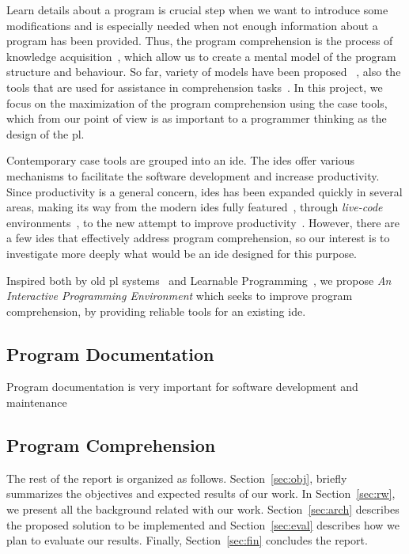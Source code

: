 Learn details about a program is crucial step when we want to introduce some modifications and is especially needed when not enough information about a program has been provided. Thus, the program comprehension is the process of knowledge acquisition~\cite{rugaber1995program}, which allow us to create a mental model of the program structure and behaviour. So far, variety of models have been proposed ~\cite{brooks1977towards,soloway1984empirical}, also the tools that are used for assistance in comprehension tasks~\cite{storey2005theories}. In this project, we focus on the maximization of the program comprehension using the \ac{case} tools, which from our point of view is as important to a programmer thinking as the design of the \ac{pl}. 

Contemporary \ac{case} tools are grouped into an \ac{ide}. The \ac{ide}s offer various mechanisms to facilitate the software development and increase productivity. Since productivity is a general concern, \ac{ide}s has been expanded quickly in several areas, making its way from the modern \ac{ide}s fully featured~\cite{carlson2005eclipse,boudreau2002netbeans}, through \textit{live-code} environments~\cite{mclean2010visualisation,sorensen2005impromptu,PER-GRA:2007,GuoSIGCSE2013}, to the new attempt to improve productivity~\cite{lighttable}. However, there are a few \ac{ide}s that effectively address program comprehension, so our interest is to investigate more deeply what would be an \ac{ide} designed for this purpose.

Inspired both by old \ac{pl} systems~\cite{papert1980mindstorms,goldberg1983smalltalk} and Learnable Programming~\cite{learnableProg,inventingPrin}, we propose \textit{An Interactive Programming Environment} which seeks to improve program comprehension, by providing reliable tools for an existing \ac{ide}. 



\subsection{Program Documentation}

Program documentation is very important for software development and maintenance

\subsection{Program Comprehension}



The rest of the report is organized as follows. Section~\ref{sec:obj}, briefly summarizes the objectives and expected results of our work. In Section~\ref{sec:rw}, we present all the background related with our work. Section~\ref{sec:arch} describes the proposed solution to be implemented and Section~\ref{sec:eval} describes how we plan to evaluate our results. Finally, Section~\ref{sec:fin} concludes the report.